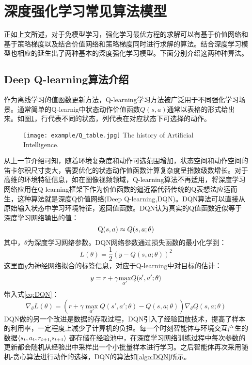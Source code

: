 \section{深度强化学习常见算法模型}
正如上文所述，对于免模型学习，强化学习最优方程的求解可以有基于价值网络和基于策略梯度以及结合价值网络和策略梯度同时进行求解的算法。结合深度学习模型也相应的延生出了两种基本的深度强化学习模型。下面分别介绍这两种种算法。
\subsection{Deep Q-learning算法介绍}
作为离线学习的值函数更新方法，Q-learning学习方法被广泛用于不同强化学习场景。通常简单的Q-learnig中状态动作价值函数$Q(s,a)$通常以表格的形式给出来。如图\ref{fig:8}，行代表不同的状态，列代表在对应状态下可选择的动作。
\begin{figure}[htpb]
	\centering
	\texttt{[image: example/Q\_table.jpg]}
	{The history of Artificial Intelligence.}
	\label{fig:8}
\end{figure}
从上一节介绍可知，随着环境复杂度和动作可选范围增加，状态空间和动作空间的笛卡尔积尺寸变大，需要优化的状态动作值函数计算复杂度呈指数级数增长。对于高维的环境特征信息，如在图像视频领域，Q-learning算法不再适用，将深度学习网络应用在Q-learning框架下作为价值函数的逼近器代替传统的Q表想法应运而生，这种算法就是深度Q价值网络(Deep Q-learning,DQN)。DQN算法可以直接从原始输入状态中学习环境特征，返回值函数。DQN认为真实的Q值函数近似等于深度学习网络输出的值：
\begin{equation}
	{\rm{Q}}(s,a) \approx Q(s,a;\theta )
\end{equation}
其中，$\theta $为深度学习网络参数。DQN网络参数通过损失函数的最小化学到：
\begin{equation}
\label{eq:DQN}
L(\theta ) = \frac{1}{2}{(y - Q(s,a;\theta ))^2}
\end{equation}
这里面$y$为神经网络拟合的标签信息，对应于Q-learning中对目标的估计：
\begin{equation}
y = r + \gamma {\max _{a'}}Q({\rm{s'}},a';\theta )
\end{equation}
带入式\ref{eq:DQN}：
\begin{equation}
\label{eq:DQN2}
	{\nabla _\theta }L(\theta ) = (r + \gamma \mathop {\max }\limits_{a'} Q(s',a';\theta ) - Q(s,a;\theta )){\nabla _\theta }Q(s,a;\theta )
\end{equation}
DQN做的另一个改进是数据的存取过程，DQN引入了经验回放技术，提高了样本的利用率，一定程度上减少了计算机的负担。每一个时刻智能体与环境交互产生的数据$ \left\langle {{s_t},{a_t},{r_{t + 1,}}{{\rm{s}}_{t + 1}}} \right\rangle $ 都存储在经验池中，在深度学习网络训练过程中每次参数的更新都会随机从经验出中采样出一个小批量样本进行学习。之后智能体再次采用随机-贪心算法进行动作的选择，DQN的算法如\ref{algo:DQN}所示。

